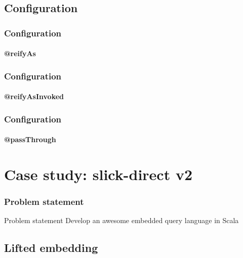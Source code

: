 \documentclass[xcolor=dvipsnames]{beamer}
\theoremstyle{definition}
\begin{document}

\subsection{Configuration} %
\label{sub:Directembeddingconfiguration}
\begin{frame}[fragile]
    \frametitle{Configuration}
    \framesubtitle{@reifyAs}
    \begin{block}{}
        
    \end{block}
\end{frame}

\begin{frame}[fragile]
    \frametitle{Configuration}
    \framesubtitle{@reifyAsInvoked}
    \begin{block}{}
        
    \end{block}
\end{frame}

\begin{frame}[fragile]
    \frametitle{Configuration}
    \framesubtitle{@passThrough}
    \begin{block}{}
        
    \end{block}
\end{frame}



\section{Case study: slick-direct v2} %
\label{sec:Slick-direct}

\begin{frame}[fragile]
    \frametitle{Problem statement}
    \begin{block}{Problem statement}
        Develop an awesome embedded query language in Scala
    \end{block}
\end{frame}

\subsection{Lifted embedding} %
\label{sub:Liftedembedding}
\end{document}
